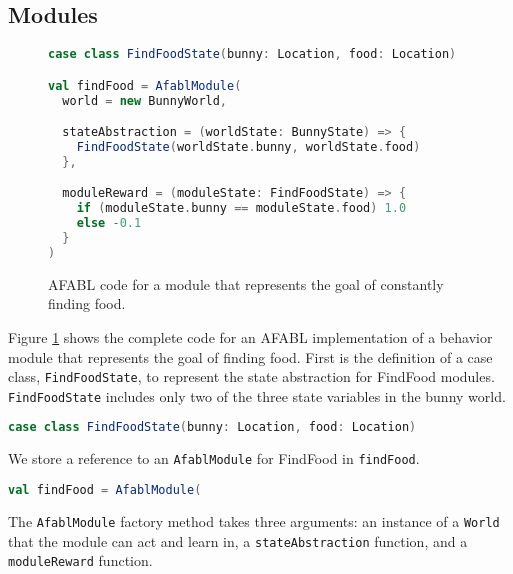 \subsection{Modules}\label{sec:afabl-modules}

\begin{figure}[!h]
\begin{center}

\begin{lstlisting}[language=Scala]
case class FindFoodState(bunny: Location, food: Location)

val findFood = AfablModule(
  world = new BunnyWorld,

  stateAbstraction = (worldState: BunnyState) => {
    FindFoodState(worldState.bunny, worldState.food)
  },

  moduleReward = (moduleState: FindFoodState) => {
    if (moduleState.bunny == moduleState.food) 1.0
    else -0.1
  }
)
\end{lstlisting}

\caption{AFABL code for a module that represents the goal of constantly finding food.}
\end{center}
\label{fig:find-food-code}
\end{figure}

Figure \ref{fig:find-food-code} shows the complete code for an AFABL implementation of a behavior module that represents the goal of finding food. First is the definition of a case class, {\tt FindFoodState}, to represent the state abstraction for FindFood modules. {\tt FindFoodState} includes only two of the three state variables in the bunny world.

\begin{center}
\begin{lstlisting}[language=Scala,frame=none]
case class FindFoodState(bunny: Location, food: Location)
\end{lstlisting}
\end{center}

We store a reference to an {\tt AfablModule} for FindFood in {\tt findFood}.

\begin{center}
\begin{lstlisting}[language=Scala,frame=none]
val findFood = AfablModule(
\end{lstlisting}
\end{center}

The {\tt AfablModule} factory method takes three arguments: an instance of a {\tt World} that the module can act and learn in, a {\tt stateAbstraction} function, and a {\tt moduleReward} function.


